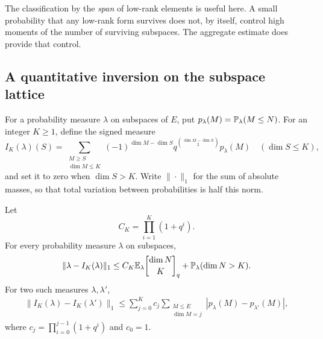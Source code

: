 The classification by the \emph{span} of low-rank elements is useful
here.  A small probability that any low-rank form survives does not,
by itself, control high moments of the number of surviving subspaces.
The aggregate estimate does provide that control.

\subsection{A quantitative inversion on the subspace lattice}

For a probability measure $\lambda$ on subspaces of $E$, put
$p_\lambda(M)=\mathbb P_\lambda(M\le N)$.  For an integer $K\ge1$, define
the signed measure
\begin{equation}
 I_K(\lambda)(S)=
 \sum_{\substack{M\ge S\\\dim M\le K}}
 (-1)^{\dim M-\dim S}
 q^{\binom{\dim M-\dim S}{2}}p_\lambda(M)
 \quad(\dim S\le K),
 \label{ker:truncated-inversion}
\end{equation}
and set it to zero when $\dim S>K$.  Write $\|\cdot\|_1$ for the
sum of absolute masses, so that total variation between probabilities
is half this norm.

\begin{lemma}
\label{ker:inversion-bound}
Let
\[
 C_K=\prod_{i=1}^K(1+q^i).
\]
For every probability measure $\lambda$ on subspaces,
\begin{equation}
 \|\lambda-I_K(\lambda)\|_1
 \le C_K\E_\lambda\qbinom{\dim N}{K}
       +\Pbb_\lambda(\dim N>K).
 \label{ker:truncation-bound}
\end{equation}
For two such measures $\lambda,\lambda'$,
\begin{equation}
 \begin{split}
 \|I_K(\lambda)-I_K(\lambda')\|_1
 \le\sum_{j=0}^K c_j
 \sum_{\substack{M\le E\\\dim M=j}}
 |p_\lambda(M)-p_{\lambda'}(M)|,
 \end{split}
 \label{ker:inversion-comparison}
\end{equation}
where $c_j=\prod_{i=0}^{j-1}(1+q^i)$ and $c_0=1$.
\end{lemma}

